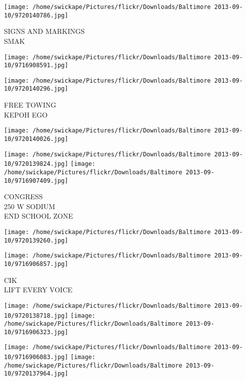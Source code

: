 \documentclass[10pt,letterpaper]{article}
\begin{document}
\vspace{0.25in}
\texttt{[image: /home/swickape/Pictures/flickr/Downloads/Baltimore 2013-09-10/9720140786.jpg]}

SIGNS AND MARKINGS\\
SMAK\\
\pagebreak

\texttt{[image: /home/swickape/Pictures/flickr/Downloads/Baltimore 2013-09-10/9716908591.jpg]}

\vspace{0.25in}
\texttt{[image: /home/swickape/Pictures/flickr/Downloads/Baltimore 2013-09-10/9720140296.jpg]}

FREE TOWING\\
KEPOH EGO\\
\pagebreak

\texttt{[image: /home/swickape/Pictures/flickr/Downloads/Baltimore 2013-09-10/9720140026.jpg]}

\vspace{0.25in}
\texttt{[image: /home/swickape/Pictures/flickr/Downloads/Baltimore 2013-09-10/9720139824.jpg]}
\texttt{[image: /home/swickape/Pictures/flickr/Downloads/Baltimore 2013-09-10/9716907409.jpg]}

CONGRESS\\
250 W SODIUM\\
END SCHOOL ZONE\\
\pagebreak

\texttt{[image: /home/swickape/Pictures/flickr/Downloads/Baltimore 2013-09-10/9720139260.jpg]}

\vspace{0.25in}
\texttt{[image: /home/swickape/Pictures/flickr/Downloads/Baltimore 2013-09-10/9716906857.jpg]}

CIK\\
LIFT EVERY VOICE\\
\pagebreak

\texttt{[image: /home/swickape/Pictures/flickr/Downloads/Baltimore 2013-09-10/9720138718.jpg]}
\texttt{[image: /home/swickape/Pictures/flickr/Downloads/Baltimore 2013-09-10/9716906323.jpg]}

\texttt{[image: /home/swickape/Pictures/flickr/Downloads/Baltimore 2013-09-10/9716906083.jpg]}
\texttt{[image: /home/swickape/Pictures/flickr/Downloads/Baltimore 2013-09-10/9720137964.jpg]}
\end{document}
